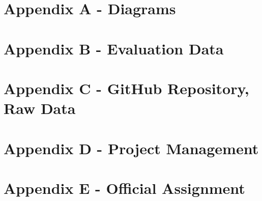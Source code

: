 \section{Appendix A - Diagrams}


\clearpage
\section{Appendix B - Evaluation Data}


\clearpage
\section{Appendix C - GitHub Repository, Raw Data}


\clearpage
\section{Appendix D - Project Management}


\clearpage
\section{Appendix E - Official Assignment}

